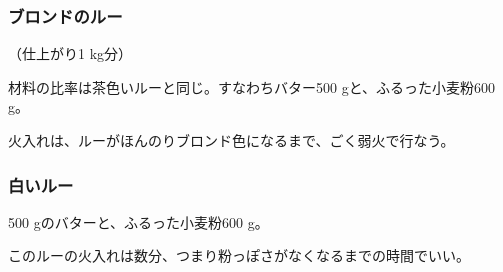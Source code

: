 \begin{recette}
\atoaki{}

\hypertarget{roux-blond}{%
\subsubsection{ブロンドのルー}\label{roux-blond}}


 

（仕上がり1 kg分）

材料の比率は茶色いルーと同じ。すなわちバター500 gと、ふるった小麦粉600
g。

火入れは、ルーがほんのりブロンド色になるまで、ごく弱火で行なう。

\atoaki{}

\hypertarget{roux-blanc}{%
\subsubsection{白いルー}\label{roux-blanc}}


 
 

500 gのバターと、ふるった小麦粉600 g。

このルーの火入れは数分、つまり粉っぽさがなくなるまでの時間でいい。

 

\end{recette}
